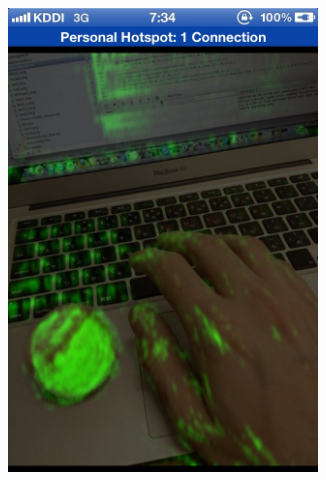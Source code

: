 \begin{figure}[ht]
\begin{subfigure}[b]{.3\linewidth}
	   \includegraphics[width=0.9\textwidth]{images/IMG_1809.jpg}
\caption{}
\label{scre2}
	 \end{subfigure}
\begin{subfigure}[b]{.3\linewidth}

\end{subfigure}
\end{figure}
